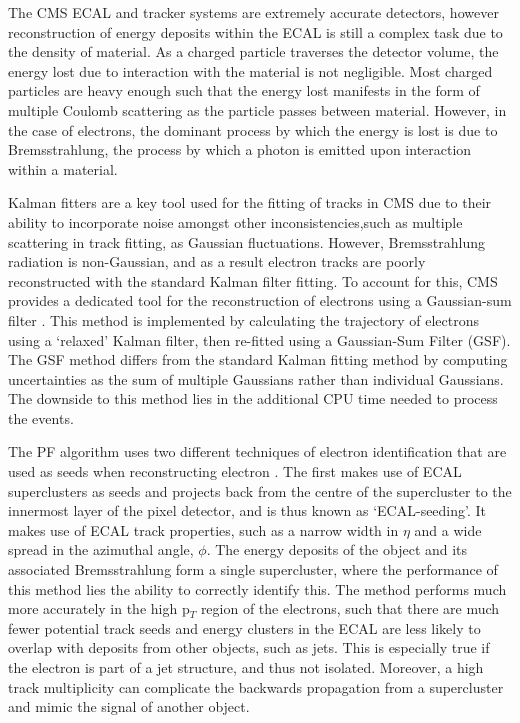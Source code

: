 The CMS ECAL and tracker systems are extremely accurate detectors, however reconstruction of energy deposits within the ECAL is still a complex task due to the density of material. As a charged particle traverses the detector volume, the energy lost due to interaction with the material is not negligible. Most charged particles are heavy enough such that the energy lost manifests in the form of multiple Coulomb scattering as the particle passes between material. However, in the case of electrons, the dominant process by which the energy is lost is due to Bremsstrahlung, the process by which a photon is emitted upon interaction within a material. 

Kalman fitters are a key tool used for the fitting of tracks in CMS due to their ability to incorporate noise amongst other inconsistencies,such as multiple scattering in track fitting, as Gaussian fluctuations. However, Bremsstrahlung radiation is non-Gaussian, and as a result electron tracks are poorly reconstructed with the standard Kalman filter fitting. To account for this, CMS provides a dedicated tool for the reconstruction of electrons using a Gaussian-sum filter \cite{0954-3899-31-9-N01}. This method is implemented by calculating the trajectory of electrons using a `relaxed' Kalman filter, then re-fitted using a Gaussian-Sum Filter (GSF). The GSF method differs from the standard Kalman fitting method by computing uncertainties as the sum of multiple Gaussians rather than individual Gaussians. The downside to this method lies in the additional CPU time needed to process the events. 

The PF algorithm uses two different techniques of electron identification that are used as seeds when reconstructing electron \cite{CMS-PAS-PFT-10-003}. The first makes use of ECAL superclusters as seeds and projects back from the centre of the supercluster to the innermost layer of the pixel detector, and is thus known as `ECAL-seeding'. It makes use of ECAL track properties, such as a narrow width in $\eta$ and a wide spread in the azimuthal angle, $\phi$. The energy deposits of the object and its associated Bremsstrahlung form a single supercluster, where the performance of this method lies the ability to correctly identify this. The method performs much more accurately in the high p$_T$ region of the electrons, such that there are much fewer potential track seeds and energy clusters in the ECAL are less likely to overlap with deposits from other objects, such as jets. This is especially true if the electron is part of a jet structure, and thus not isolated. Moreover, a high track multiplicity can complicate the backwards propagation from a supercluster and mimic the signal of another object.

